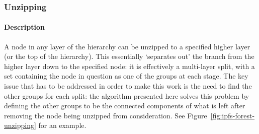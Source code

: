 \newpage

\subsubsection{Unzipping}


\paragraph{Description}

A node in any layer of the hierarchy can be unzipped to a specified higher layer (or the top of the hierarchy). This essentially `separates out' the branch from the higher layer down to the specified node: it is effectively a multi-layer split, with a set containing the node in question as one of the groups at each stage. The key issue that has to be addressed in order to make this work is the need to find the other groups for each split: the algorithm presented here solves this problem by defining the other groups to be the connected components of what is left after removing the node being unzipped from consideration. See Figure~\ref{fig:ipfs-forest-unzipping} for an example.

